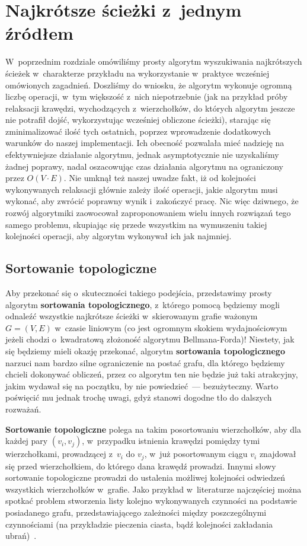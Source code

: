 \chapter{Najkrótsze ścieżki z~jednym źródłem}

W~poprzednim rozdziale omówiliśmy prosty algorytm wyszukiwania najkrótszych ścieżek w~charakterze przykładu na wykorzystanie w~praktyce wcześniej omówionych zagadnień. Doszliśmy do wniosku, że algorytm wykonuje ogromną liczbę operacji, w~tym większość z~nich niepotrzebnie (jak na przykład próby relaksacji krawędzi, wychodzących z~wierzchołków, do których algorytm jeszcze nie potrafił dojść, wykorzystując wcześniej obliczone ścieżki), starając się zminimalizować ilość tych ostatnich, poprzez wprowadzenie dodatkowych warunków do naszej implementacji. Ich obecność pozwalała mieć nadzieję na efektywniejsze działanie algorytmu, jednak asymptotycznie nie uzyskaliśmy żadnej poprawy, nadal oszacowując czas działania algorytmu na ograniczony przez $O \left( V \cdot E \right)$. Nie umknął też naszej uwadze fakt, iż od kolejności wykonywanych relaksacji głównie zależy ilość operacji, jakie algorytm musi wykonać, aby zwrócić poprawny wynik i~zakończyć pracę. Nic więc dziwnego, że rozwój algorytmiki zaowocował zaproponowaniem wielu innych rozwiązań tego samego problemu, skupiając się przede wszystkim na wymuszeniu takiej kolejności operacji, aby algorytm wykonywał ich jak najmniej.

\section{Sortowanie topologiczne}

Aby przekonać się o~skuteczności takiego podejścia, przedstawimy prosty algorytm \textbf{sortowania topologicznego}, z~którego pomocą będziemy mogli odnaleźć wszystkie najkrótsze ścieżki w~skierowanym grafie ważonym $G = \left( V, E \right)$ w~czasie liniowym (co jest ogromnym skokiem wydajnościowym jeżeli chodzi o~kwadratową złożoność algorytmu Bellmana-Forda)! Niestety, jak się będziemy mieli okazję przekonać, algorytm \textbf{sortowania topologicznego} narzuci nam bardzo silne ograniczenie na postać grafu, dla którego będziemy chcieli dokonywać obliczeń, przez co algorytm ten nie będzie już taki atrakcyjny, jakim wydawał się na początku, by nie powiedzieć~--- bezużyteczny. Warto poświęcić mu jednak trochę uwagi, gdyż stanowi dogodne tło do dalszych rozważań.

\textbf{Sortowanie topologiczne} polega na takim posortowaniu wierzchołków, aby dla każdej pary $ \left( v_{i}, v_{j} \right)$, w~przypadku istnienia krawędzi pomiędzy tymi wierzchołkami, prowadzącej z~$v_{i}$ do $v_{j}$, w~już posortowanym ciągu $v_{i}$ znajdował się przed wierzchołkiem, do którego dana krawędź prowadzi. Innymi słowy sortowanie topologiczne prowadzi do ustalenia możliwej kolejności odwiedzeń wszystkich wierzchołków w~grafie. Jako przykład w~literaturze najczęściej można spotkać problem stworzenia listy kolejno wykonywanych czynności na podstawie posiadanego grafu, przedstawiającego zależności między poszczególnymi czynnościami (na przykładzie pieczenia ciasta, bądź kolejności zakładania ubrań)~\cite[$22.4$]{Cormen}. 

